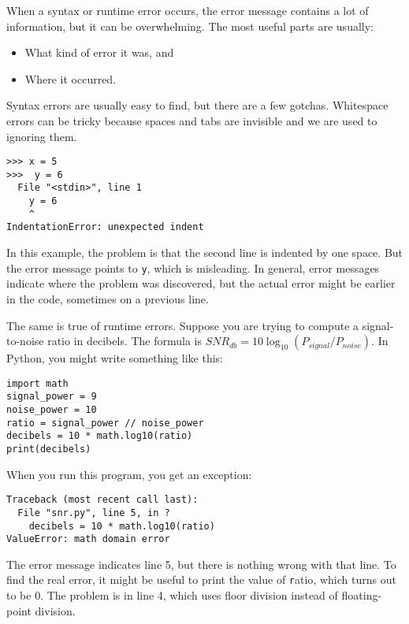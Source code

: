 \documentclass[
DIV=11,
fontsize=13,
twoside,
headinclude=false,
titlepage=firstiscover,
abstract=true,
headsepline=true,
footsepline=true,
chapterprefix=true, %
headings=big,
bibliography=totoc,%
captions=tableheading
]{scrbook}
\theoremstyle{definition}
\begin{document}
When a syntax or runtime error occurs, the error message contains
a lot of information, but it can be overwhelming.  The most
useful parts are usually:

\begin{itemize}

\item What kind of error it was, and

\item Where it occurred.

\end{itemize}

Syntax errors are usually easy to find, but there are a few
gotchas.  Whitespace errors can be tricky because spaces and
tabs are invisible and we are used to ignoring them.

\begin{lstlisting}
>>> x = 5
>>>  y = 6
  File "<stdin>", line 1
    y = 6
    ^
IndentationError: unexpected indent
\end{lstlisting}
%
In this example, the problem is that the second line is indented by
one space.  But the error message points to {\texttt y}, which is
misleading.  In general, error messages indicate where the problem was
discovered, but the actual error might be earlier in the code,
sometimes on a previous line.

The same is true of runtime errors.  Suppose you are trying
to compute a signal-to-noise ratio in decibels.  The formula
is $SNR_{db} = 10 \log_{10} (P_{signal} / P_{noise})$.  In Python,
you might write something like this:

\begin{lstlisting}
import math
signal_power = 9
noise_power = 10
ratio = signal_power // noise_power
decibels = 10 * math.log10(ratio)
print(decibels)
\end{lstlisting}
%
When you run this program, you get an exception:
%

\begin{lstlisting}
Traceback (most recent call last):
  File "snr.py", line 5, in ?
    decibels = 10 * math.log10(ratio)
ValueError: math domain error
\end{lstlisting}
%
The error message indicates line 5, but there is nothing
wrong with that line.  To find the real error, it might be
useful to print the value of {\texttt ratio}, which turns out to
be 0.  The problem is in line 4, which uses floor division
instead of floating-point division.
\end{document}
